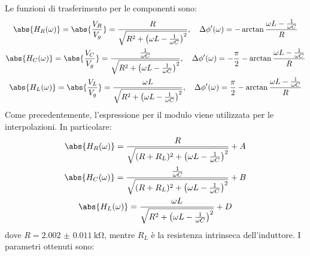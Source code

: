 \documentclass[a4paper]{article}
\begin{document}
Le funzioni di trasferimento per le componenti sono:
\begin{gather*}
	\abs{H_R(\omega)}=\abs{\frac{V_R}{V_g}}=\frac{R}{\sqrt{R^2+\left( \omega L-\frac{1}{\omega C} \right)^2} },\quad \Delta \phi'(\omega)=-\arctan \frac{\omega L-\frac{1}{\omega C}}{R}\\
	\abs{H_C(\omega)}=\abs{\frac{V_C}{V_g}}=\frac{\frac{1}{\omega C}}{\sqrt{R^2+\left( \omega L-\frac{1}{\omega C} \right)^2} },\quad \Delta \phi'(\omega)=-\frac{\pi}{2}-\arctan \frac{\omega L-\frac{1}{\omega C}}{R}\\
	\abs{H_L(\omega)}=\abs{\frac{V_L}{V_g}}=\frac{\omega L}{\sqrt{R^2+\left( \omega L-\frac{1}{\omega C} \right)^2} },\quad \Delta \phi'(\omega)=\frac{\pi}{2}-\arctan \frac{\omega L-\frac{1}{\omega C}}{R}
\end{gather*}
Come precedentemente, l'espressione per il modulo viene utilizzata per le interpolazioni. In particolare:
\begin{gather*}
	\abs{H_R(\omega)}=\frac{R}{\sqrt{(R+R_L)^2+\left( \omega L-\frac{1}{\omega C} \right)^2} }+A\\
	\abs{H_C(\omega)}=\frac{\frac{1}{\omega C}}{\sqrt{(R+R_L)^2+\left( \omega L-\frac{1}{\omega C} \right)^2} }+B\\
	\abs{H_L(\omega)}=\frac{\omega L}{\sqrt{R^2+\left( \omega L-\frac{1}{\omega C} \right)^2} }+D
\end{gather*}
dove $R=\SI{2.002(11)}{\kohm}$, mentre $R_L$ è la resistenza intrinseca dell'induttore. I parametri ottenuti sono:
\end{document}
